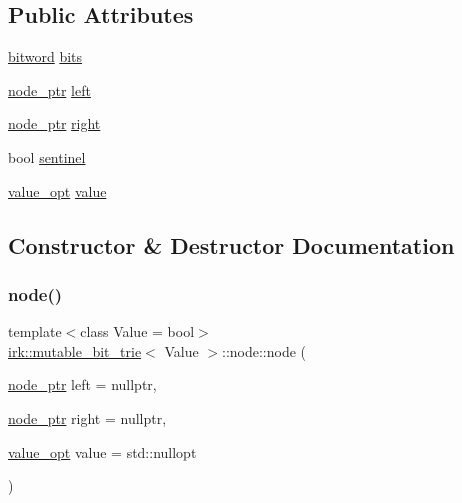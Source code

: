 \subsection*{Public Attributes}
\begin{DoxyCompactItemize}
\item 
\mbox{\hyperlink{namespaceirk_a979e09720c2ef05573819388a3c0e79a}{bitword}} \mbox{\hyperlink{structirk_1_1mutable__bit__trie_1_1node_a8b55d968fa4274a91a6395ea1b9785a8}{bits}}
\item 
\mbox{\hyperlink{classirk_1_1mutable__bit__trie_abd23179ac4f02a981d4f47b4c0652287}{node\+\_\+ptr}} \mbox{\hyperlink{structirk_1_1mutable__bit__trie_1_1node_af59565476fb0ce3e3e3d57edbd8ca1de}{left}}
\item 
\mbox{\hyperlink{classirk_1_1mutable__bit__trie_abd23179ac4f02a981d4f47b4c0652287}{node\+\_\+ptr}} \mbox{\hyperlink{structirk_1_1mutable__bit__trie_1_1node_ad75512c087c6adaf342b9c62fd115f55}{right}}
\item 
bool \mbox{\hyperlink{structirk_1_1mutable__bit__trie_1_1node_a54f76adb0cab3a380ba75cc039065e4d}{sentinel}}
\item 
\mbox{\hyperlink{classirk_1_1mutable__bit__trie_a9a5ed79af3e7e28054b00c2284b35612}{value\+\_\+opt}} \mbox{\hyperlink{structirk_1_1mutable__bit__trie_1_1node_a1bacc998d6276431578e9ecb8f3dfa59}{value}}
\end{DoxyCompactItemize}


\subsection{Constructor \& Destructor Documentation}
\mbox{\label{structirk_1_1mutable__bit__trie_1_1node_a74037ab76023b8ff9c1cd88f91d06684}} 
\subsubsection{\texorpdfstring{node()}{node()}\hspace{0.1cm}{\footnotesize\ttfamily [1/2]}}
{\footnotesize\ttfamily template$<$class Value = bool$>$ \\
\mbox{\hyperlink{classirk_1_1mutable__bit__trie}{irk\+::mutable\+\_\+bit\+\_\+trie}}$<$ Value $>$\+::node\+::node (\begin{DoxyParamCaption}\item[{\mbox{\hyperlink{classirk_1_1mutable__bit__trie_abd23179ac4f02a981d4f47b4c0652287}{node\+\_\+ptr}}}]{left = {\ttfamily nullptr},  }\item[{\mbox{\hyperlink{classirk_1_1mutable__bit__trie_abd23179ac4f02a981d4f47b4c0652287}{node\+\_\+ptr}}}]{right = {\ttfamily nullptr},  }\item[{\mbox{\hyperlink{classirk_1_1mutable__bit__trie_a9a5ed79af3e7e28054b00c2284b35612}{value\+\_\+opt}}}]{value = {\ttfamily std\+:\+:nullopt} }\end{DoxyParamCaption})\hspace{0.3cm}{\ttfamily [inline]}}

